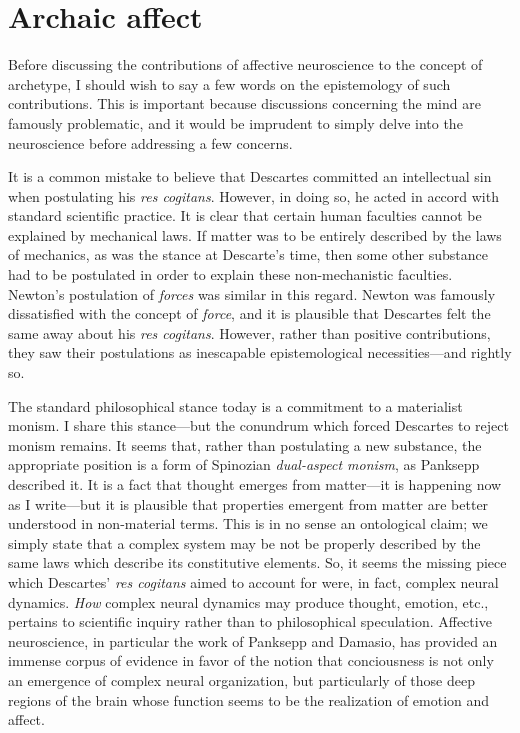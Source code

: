 \documentclass[a4paper]{article}
\begin{document}
\section{Archaic affect}

Before discussing the contributions of affective neuroscience to the concept of
archetype, I should wish to say a few words on the epistemology of such
contributions. This is important because discussions concerning the mind are
famously problematic, and it would be imprudent to simply delve into the
neuroscience before addressing a few concerns.

It is a common mistake to believe that Descartes committed an intellectual sin
when postulating his \textit{res cogitans}. However, in doing so, he acted in
accord with standard scientific practice. It is clear that certain human
faculties cannot be explained by mechanical laws. If matter was to be entirely
described by the laws of mechanics, as was the stance at Descarte's time, then
some other substance had to be postulated in order to explain these
non-mechanistic faculties. Newton's postulation of \textit{forces} was
similar in this regard. Newton was famously dissatisfied with the concept of
\textit{force}, and it is plausible that Descartes felt the same away about his
\textit{res cogitans}. However, rather than positive contributions, they saw
their postulations as inescapable epistemological necessities---and rightly so.

The standard philosophical stance today is a commitment to a materialist
monism. I share this stance---but the conundrum which forced Descartes to
reject monism remains. It seems that, rather than postulating a new substance,
the appropriate position is a form of Spinozian \textit{dual-aspect monism}, as
Panksepp described it. It is a fact that thought emerges from matter---it is
happening now as I write---but it is plausible that properties emergent from
matter are better understood in non-material terms. This is in no sense an
ontological claim; we simply state that a complex system may be not be properly
described by the same laws which describe its constitutive elements. So, it
seems the missing piece which Descartes' \textit{res cogitans} aimed to account
for were, in fact, complex neural dynamics. \textit{How} complex neural dynamics
may produce thought, emotion, etc., pertains to scientific inquiry rather than
to philosophical speculation. Affective neuroscience, in particular the work of
Panksepp and Damasio, has provided an immense corpus of evidence in favor of the
notion that conciousness is not only an emergence of complex neural
organization, but particularly of those deep regions of the brain whose function
seems to be the realization of emotion and affect.
\end{document}
